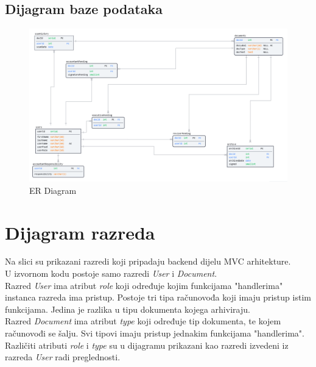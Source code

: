 			
			\subsection{Dijagram baze podataka}
			
			\eject
			\begin{figure}
				\includegraphics[width=\linewidth]{./dijagrami/ER.png}
				\caption{ER Diagram}
				\label{fig:ER}
			\end{figure}
			
			
		\section{Dijagram razreda}
			
			Na slici su prikazani razredi koji pripadaju backend dijelu MVC
			arhitekture.\\
			U izvornom kodu postoje samo razredi \textit{User} i \textit{Document}.\\ Razred \textit{User} ima atribut \textit{role} koji određuje kojim funkcijama "handlerima" instanca razreda ima pristup. Postoje tri tipa računovođa koji imaju pristup istim funkcijama. Jedina je razlika u tipu dokumenta kojega arhiviraju.\\
			Razred \textit{Document} ima atribut \textit{type} koji određuje tip dokumenta, te kojem računovođi se šalju. Svi tipovi imaju pristup jednakim funkcijama "handlerima".\\
			Različiti atributi \textit{role} i \textit{type} su u dijagramu prikazani kao razredi izvedeni iz razreda \textit{User} radi preglednosti.\\
			
